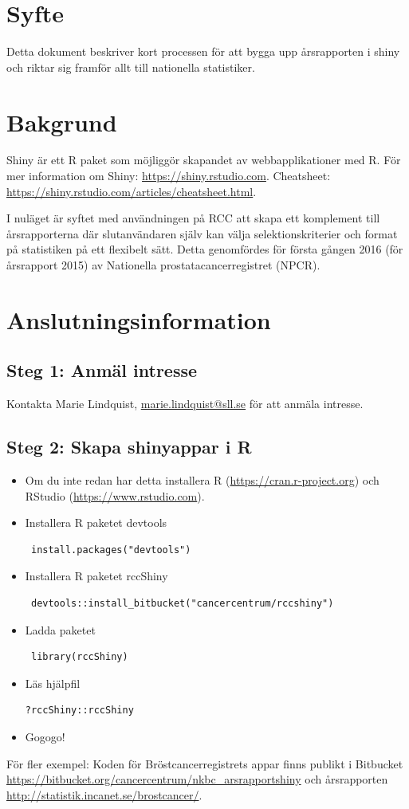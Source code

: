 \documentclass[12pt, a4paper,twoside]{report}
\begin{document}
\section{Syfte}
Detta dokument beskriver kort processen för att bygga upp årsrapporten i shiny och riktar sig framför allt till nationella statistiker. 
\section{Bakgrund}
Shiny är ett R paket som möjliggör skapandet av webbapplikationer med R. För mer information om Shiny: \url{https://shiny.rstudio.com}.  Cheatsheet: \url{https://shiny.rstudio.com/articles/cheatsheet.html}.

I nuläget är syftet med användningen på RCC att skapa ett komplement till årsrapporterna där slutanvändaren själv kan välja selektionskriterier och format på statistiken på ett flexibelt sätt. Detta genomfördes för första gången 2016 (för årsrapport 2015) av Nationella prostatacancerregistret (NPCR).  
\section{Anslutningsinformation}
\subsection{Steg 1: Anmäl intresse}
Kontakta Marie Lindquist, \href{mailto:marie.lindquist@sll.se}{marie.lindquist@sll.se} för att anmäla intresse. %
\subsection{Steg 2: Skapa shinyappar i R}
\begin{itemize}
\item Om du inte redan har detta installera R (\url{https://cran.r-project.org}) och RStudio (\url{https://www.rstudio.com}). 
\item Installera R paketet devtools \begin{verbatim} install.packages("devtools")\end{verbatim} 
\item Installera R paketet rccShiny \begin{verbatim} devtools::install_bitbucket("cancercentrum/rccshiny")\end{verbatim} 
\item Ladda paketet \begin{verbatim} library(rccShiny)\end{verbatim} 
\item Läs hjälpfil \begin{verbatim}?rccShiny::rccShiny\end{verbatim} 
\item Gogogo!  
\end{itemize}
För fler exempel: Koden för Bröstcancerregistrets appar finns publikt i Bitbucket \url{https://bitbucket.org/cancercentrum/nkbc_arsrapportshiny} och årsrapporten \url{http://statistik.incanet.se/brostcancer/}. 
\end{document}
